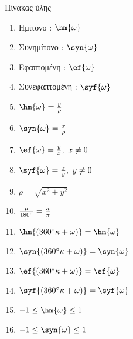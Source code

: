 \documentclass[twoside,nofonts,internet,math,spyros]{frontisthrio}
\begin{document}
\begin{mybox}[mysubtitle]{Πίνακας ύλης}
\setlength{\columnsep}{0.2cm}
\begin{multicols}{3}
\begin{enumerate}[itemsep=0mm]
\item Ημίτονο : $ \hm{\omega} $
\item Συνημίτονο : $ \syn{\omega} $
\item Εφαπτομένη : $ \ef{\omega} $
\item Συνεφαπτομένη : $ \syf{\omega} $
\item $ \hm{\omega}=\frac{y}{\rho} $
\item $ \syn{\omega}=\frac{x}{\rho} $
\item $ \ef{\omega}=\frac{y}{x},\ x\neq 0 $
\item $ \syf{\omega}=\frac{x}{y},\ y\neq 0 $
\item $ \rho=\sqrt{x^2+y^2} $
\item $ \frac{\mu}{180\degree}=\frac{a}{\pi} $
\item $ \hm{\left( 360\degree \kappa+\omega\right) }=\hm{\omega} $
\item $ \syn{\left( 360\degree \kappa+\omega\right) }=\syn{\omega} $
\item $ \ef{\left( 360\degree \kappa+\omega\right) }=\ef{\omega} $
\item $ \syf{\left( 360\degree \kappa+\omega\right) }=\syf{\omega} $
\item $ -1\leq\hm{\omega}\leq 1 $
\item $ -1\leq\syn{\omega}\leq 1 $
\end{enumerate}
\end{multicols}
\setlength{\columnsep}{1cm}
\end{mybox}
\newpage
\end{document}
